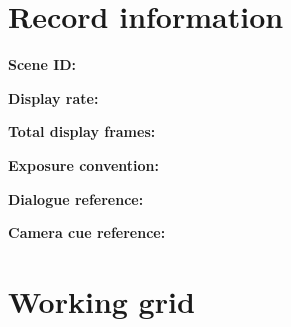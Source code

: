 \documentclass[10pt,letterpaper]{article}
\begin{document}
\makedoctitle
\makedocsummary

\section{Record information}
\noindent\textbf{Scene ID:}\quad\hrulefill\par\vspace{10pt}
\noindent\textbf{Display rate:}\quad\hrulefill\par\vspace{10pt}
\noindent\textbf{Total display frames:}\quad\hrulefill\par\vspace{10pt}
\noindent\textbf{Exposure convention:}\quad\hrulefill\par\vspace{10pt}
\noindent\textbf{Dialogue reference:}\quad\hrulefill\par\vspace{10pt}
\noindent\textbf{Camera cue reference:}\quad\hrulefill\par\vspace{10pt}\section{Working grid}
\end{document}
